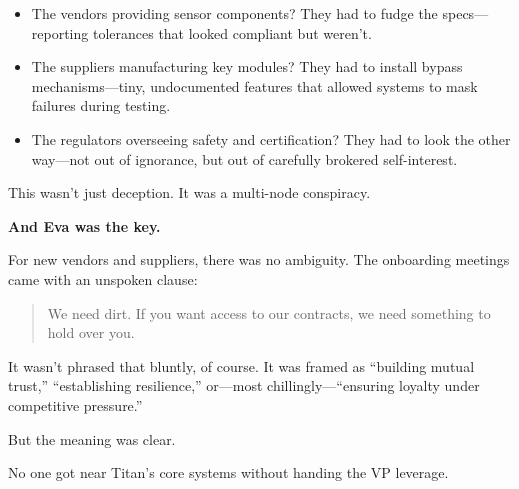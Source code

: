 \begin{itemize}
\item The vendors providing sensor components?
They had to fudge the specs—reporting tolerances that looked compliant but weren’t.
\item The suppliers manufacturing key modules?
They had to install bypass mechanisms—tiny, undocumented features that allowed systems to mask failures during testing.
\item The regulators overseeing safety and certification?
They had to look the other way—not out of ignorance, but out of carefully brokered self-interest.
\end{itemize}

This wasn’t just deception.  It was a multi-node conspiracy.

\textbf{And Eva was the key.}

For new vendors and suppliers, there was no ambiguity.  The onboarding meetings came with an unspoken clause:

\begin{quote}
We need dirt.
If you want access to our contracts,
we need something to hold over you.
\end{quote}

It wasn’t phrased that bluntly, of course.
It was framed as “building mutual trust,” “establishing resilience,”
or—most chillingly—“ensuring loyalty under competitive pressure.”

But the meaning was clear.

No one got near Titan’s core systems without handing the VP leverage.

\medskip

